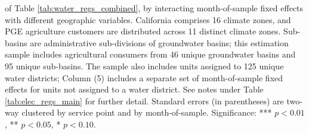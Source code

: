 \begin{table}[t!]
{of Table \ref{tab:water_regs_combined}, by interacting month-of-sample fixed effects with different geographic variables.  
California comprises 16 climate zones, and PGE agriculture customers are distributed across 11 distinct climate zones.
Sub-basins are administrative sub-divisions of groundwater basins; this estimation sample includes agricultural consumers  
from 46 unique groundwater basins and 95 unique sub-basins.  
The sample also includes units assigned to 125 unique water districts; Column (5) includes a separate set of month-of-sample 
fixed effects for units not assigned to a water district.
See notes under Table \ref{tab:elec_regs_main} for further detail. 
Standard errors (in parentheses) are two-way clustered by service point and by month-of-sample.
Significance: *** $p < 0.01$, ** $p < 0.05$, * $p < 0.10$.
}
\end{table}
